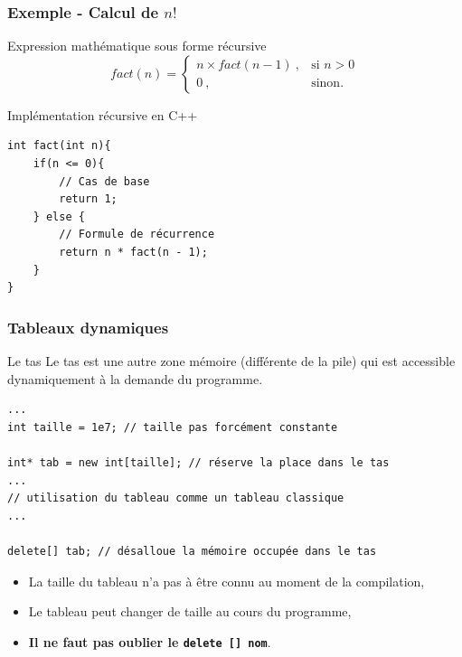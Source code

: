 \begin{frame}[fragile=singleslide]
	\frametitle{Exemple - Calcul de $n!$}
	
	\begin{block}{Expression mathématique sous forme récursive}
    $$    fact(n)= 
    \begin{cases}
        n \times fact(n-1)~, & \text{si } n > 0\\
        0~,              & \text{sinon.}
    \end{cases}
	$$
    \end{block}
	
    \begin{block}{Implémentation récursive en C++}
		\begin{verbatim}
int fact(int n){
    if(n <= 0){
    	// Cas de base
        return 1;
    } else {
    	// Formule de récurrence
        return n * fact(n - 1);
    }
}
		\end{verbatim}
    \end{block}

\end{frame}

\begin{frame}[fragile=singleslide]
	\frametitle{Tableaux dynamiques}

	\begin{block}{Le tas}
		Le tas est une autre zone mémoire (différente de la pile) qui est accessible dynamiquement à la demande du programme.
	\end{block}

	\begin{verbatim}
...
int taille = 1e7; // taille pas forcément constante

int* tab = new int[taille]; // réserve la place dans le tas
...
// utilisation du tableau comme un tableau classique
...

delete[] tab; // désalloue la mémoire occupée dans le tas
		\end{verbatim}
	
	\begin{itemize}
		\item La taille du tableau n'a pas à être connu au moment de la compilation,
        \item Le tableau peut changer de taille au cours du programme,
		\item \textbf{Il ne faut pas oublier le \texttt{delete [] nom}}.
	\end{itemize}
\end{frame}

